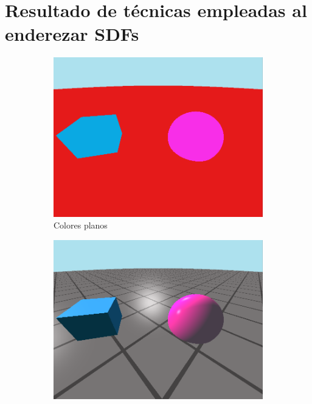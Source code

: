 
\chapter{Resultado de técnicas empleadas al enderezar SDFs}\label{ap:comparacionEscenas}

\begin{figure}[ht!]
    \centering
    \begin{subfigure}[b]{0.3\textwidth}
        \centering
        \includegraphics[width=\textwidth]{Plantilla-TFG-master/img/escena1_plana.png}
        \caption{Colores planos}
    \end{subfigure}
    \hfill
    \begin{subfigure}[b]{0.3\textwidth}
        \centering
        \includegraphics[width=\textwidth]{Plantilla-TFG-master/img/escena2_blinn.png}

\end{subfigure}
\end{figure}
